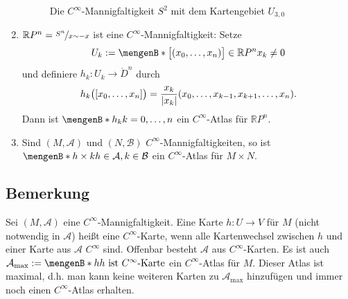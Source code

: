 \begin{enumerate}[(1)]
\begin{figure}[ht]
{\begin{tikzpicture}[scale=1.5]
		\end{tikzpicture}
		\caption{Die $C^\infty$-Mannigfaltigkeit $S^2$ mit dem Kartengebiet $U_{3,0}$}}
	\end{figure}
	\item \label{154:enum:3} $\mathds{R}P^n = \nicefrac{S^n}{x \sim -x}$ ist eine $C^\infty$-Mannigfaltigkeit: Setze 
	\[
		U_k := \set[{\benbrace[\big]{(x_0, \ldots, x_n)} \in \mathds{R}P^n}]{x_k \not= 0} 
	\]
	und definiere $h_k : U_k \to \mathring{D}^n$ durch
	\[
		h_k \enbrace[\big]{[x_0, \ldots, x_n]} = \frac{x_k}{\abs*{x_k}} \enbrace*{x_0, \ldots , x_{k-1}, x_{k+1}, \ldots, x_n} .  
	\]
	Dann ist $\set[h_k]{k=0,\ldots , n}$ ein $C^\infty$-Atlas für $\mathds{R}P^n$.
	\item Sind $(M, \mathcal{A})$ und $(N, \mathcal{B})$ $C^\infty$-Mannigfaltigkeiten, so ist $\set[h \times k]{h \in \mathcal{A}, k \in \mathcal{B}}$ ein
	$C^\infty$-Atlas für $M \times N$.
\end{enumerate}

\subsection[Bemerkung: Maximaler Atlas]{Bemerkung} %
\label{sub:155}
Sei $(M,\mathcal{A})$ eine $C^\infty$-Mannigfaltigkeit. Eine Karte $h : U \to V$ für $M$ (nicht notwendig in $\mathcal{A}$) heißt eine $C^\infty$-Karte, wenn alle 
Kartenwechsel zwischen $h$ und einer Karte aus $\mathcal{A}$ $C^\infty$ sind. Offenbar besteht $\mathcal{A}$ aus $C^\infty$-Karten. Es ist auch 
$\mathcal{A}_\mathrm{max} := \set[h]{h \text{ ist $C^\infty$-Karte}}$ ein $C^\infty$-Atlas für $M$. Dieser Atlas ist maximal, d.h. man kann keine weiteren Karten zu 
$\mathcal{A}_\mathrm{max}$ hinzufügen und immer noch einen $C^\infty$-Atlas erhalten. 

